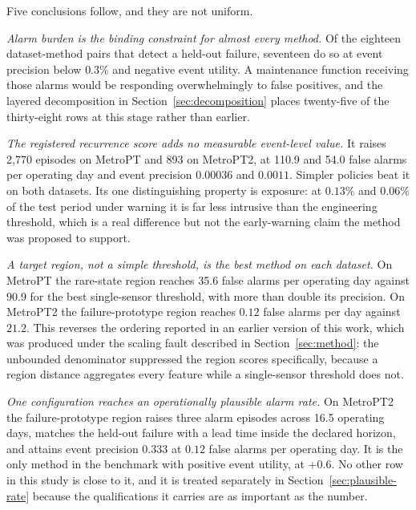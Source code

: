 

Five conclusions follow, and they are not uniform.

\emph{Alarm burden is the binding constraint for almost every method.} Of the eighteen dataset-method pairs that detect a held-out failure, seventeen do so at event precision below \(0.3\%\) and negative event utility. A maintenance function receiving those alarms would be responding overwhelmingly to false positives, and the layered decomposition in Section~\ref{sec:decomposition} places twenty-five of the thirty-eight rows at this stage rather than earlier.

\emph{The registered recurrence score adds no measurable event-level value.} It raises 2{,}770 episodes on MetroPT and 893 on MetroPT2, at 110.9 and 54.0 false alarms per operating day and event precision \(0.00036\) and \(0.0011\). Simpler policies beat it on both datasets. Its one distinguishing property is exposure: at \(0.13\%\) and \(0.06\%\) of the test period under warning it is far less intrusive than the engineering threshold, which is a real difference but not the early-warning claim the method was proposed to support.

\emph{A target region, not a simple threshold, is the best method on each dataset.} On MetroPT the rare-state region reaches 35.6 false alarms per operating day against 90.9 for the best single-sensor threshold, with more than double its precision. On MetroPT2 the failure-prototype region reaches \(0.12\) false alarms per day against \(21.2\). This reverses the ordering reported in an earlier version of this work, which was produced under the scaling fault described in Section~\ref{sec:method}: the unbounded denominator suppressed the region scores specifically, because a region distance aggregates every feature while a single-sensor threshold does not.

\emph{One configuration reaches an operationally plausible alarm rate.} On MetroPT2 the failure-prototype region raises three alarm episodes across 16.5 operating days, matches the held-out failure with a lead time inside the declared horizon, and attains event precision \(0.333\) at \(0.12\) false alarms per operating day. It is the only method in the benchmark with positive event utility, at \(+0.6\). No other row in this study is close to it, and it is treated separately in Section~\ref{sec:plausible-rate} because the qualifications it carries are as important as the number.

